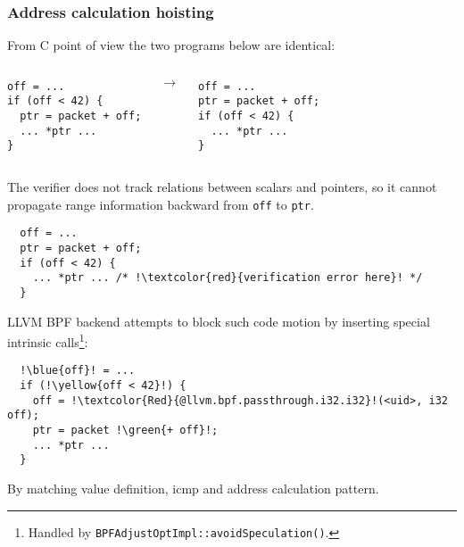 \documentclass{beamer}
\newcommand{\code}[1]{\texttt{#1}}
\newcommand{\marker}[2]{\colorbox{#1}{#2}}
\newcommand{\green }[1]{\marker{SpringGreen!40}{#1}}
\newcommand{\yellow}[1]{\marker{Goldenrod!40}{#1}}
\newcommand{\blue  }[1]{\marker{SkyBlue!40}{#1}}
\begin{document}
\begin{frame}
  \frametitle{Address calculation hoisting}

  From C point of view the two programs below are identical:
  \vspace{1cm}

  \begin{columns}
    \begin{minipage}{\textwidth}
      \begin{verbatim}
off = ...
if (off < 42) {
  ptr = packet + off;
  ... *ptr ...
}
      \end{verbatim}
    \end{minipage}
    $\rightarrow$
    \begin{minipage}{\textwidth}
      \begin{verbatim}
off = ...
ptr = packet + off;
if (off < 42) {
  ... *ptr ...
}
      \end{verbatim}
    \end{minipage}
  \end{columns}

  \framebreak

  The verifier does not track relations between scalars and pointers,
  so it cannot propagate range information backward from \code{off} to
  \code{ptr}.

  \begin{verbatim}
  off = ...
  ptr = packet + off;
  if (off < 42) {
    ... *ptr ... /* !\textcolor{red}{verification error here}! */
  }
  \end{verbatim}

  \framebreak

LLVM BPF backend attempts to block such code motion by inserting
special intrinsic calls\footnote{\tiny{Handled by \code{BPFAdjustOptImpl::avoidSpeculation()}.}}:

  \begin{verbatim}
  !\blue{off}! = ...
  if (!\yellow{off < 42}!) {
    off = !\textcolor{Red}{@llvm.bpf.passthrough.i32.i32}!(<uid>, i32 off);
    ptr = packet !\green{+ off}!;
    ... *ptr ...
  }
  \end{verbatim}

By matching value \blue{definition}, \yellow{icmp} and \green{address calculation} pattern.

\end{frame}
\end{document}
